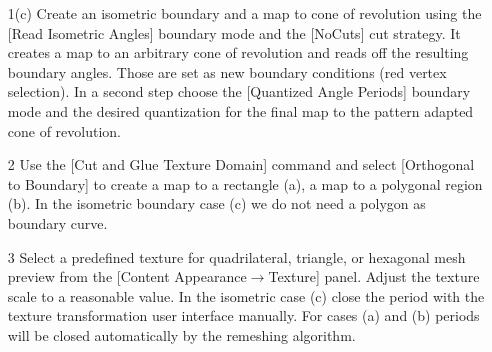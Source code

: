 \documentclass[Thesis.tex]{subfiles}
\begin{document}
\begin{itemize}
\begin{center}
\begin{minipage}{0.9\linewidth}
            \centering
\end{minipage}
\end{center}

\item[1(c)] Create an isometric boundary and a map to cone of revolution using the [Read Isometric Angles] boundary mode and the [NoCuts] cut strategy. It creates a map to an arbitrary cone of revolution and reads off the resulting boundary angles. Those are set as new boundary conditions (red vertex selection). In a second step choose the [Quantized Angle Periods] boundary mode and the desired quantization for the final map to the pattern adapted cone of revolution.

\begin{center}
\begin{minipage}{0.9\linewidth}
            \centering
\end{minipage}
\end{center}    

\item[2] Use the [Cut and Glue Texture Domain] command and select [Orthogonal to Boundary] to create a map to a rectangle (a), a map to a polygonal region (b). In the isometric boundary case (c) we do not need a polygon as boundary curve.
\item[3] Select a predefined texture for quadrilateral, triangle, or hexagonal mesh preview from the [Content Appearance$\to$Texture] panel. Adjust the texture scale to a reasonable value. In the isometric case (c) close the period with the texture transformation user interface manually. For cases (a) and (b) periods will be closed automatically by the remeshing algorithm.


\end{itemize}
\end{document}
